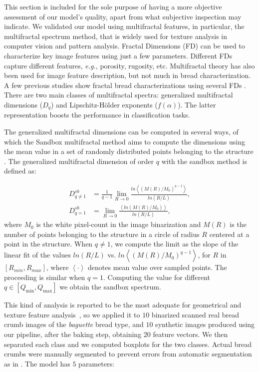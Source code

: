 This section is included for the sole purpose of having a more objective assessment of our model's quality, apart from what subjective inspection may indicate. 
We validated our model using multifractal features, in particular, the multifractal spectrum method, that is widely used for texture analysis in computer vision and pattern analysis.
Fractal Dimensions (FD) can be used to characterize key image features using just a few parameters. 
Different FDs capture different features, {\em e.g.}, porosity, rugosity, etc.
Multifractal theory has also been used for image feature description, but not much in bread characterization. 
A few previous studies show fractal bread characterizations using several FDs \cite{Gonzales2008,Baravalle2012}. 
There are two main classes of multifractal spectra: generalized multifractal dimensions ($D_{q}$) and Lipschitz-H\"older exponents ($f(\alpha)$). 
The latter representation boosts the performance in classification tasks.

The generalized multifractal dimensions can be computed in several ways, of which the Sandbox multifractal method \cite{Tel1989} aims to compute the dimensions using the mean value in a set of randomly distributed points belonging to the structure \cite{Debartolo2004}. 
The generalized multifractal dimension of order $q$ with the sandbox method is defined as:

 \begin{align*}
D_{q\ne 1}^{sb} &= \frac{1}{q-1} \lim_{R \rightarrow 0}{
\frac{ln   { \left\langle  (M(R)/M_{0})^{q-1} \right\rangle   }}
{ln {(R/L)}       }},\\
D_{q=1}^{sb} &= \lim_{R \rightarrow 0}{
\frac{ \left\langle ln   { (M(R)/M_{0})  }  \right\rangle}
{ln {(R/L)}       }},
\end{align*}
%
where $M_{0}$ is the white pixel-count in the image binarization and  $M(R)$ is the number of points belonging to the structure in a circle of radius $R$ centered at a point in the structure. 
When $q\ne1$, we compute the limit as the slope of the linear fit of the values $ln(R/L)$ vs. $ ln  \left\langle  { (M(R)/M_{0})^{q-1} }  \right\rangle$, for $R$ in $[R_{min}, R_{max}]$, where $ \left\langle \cdot  \right\rangle$ denotes mean value over sampled points. 
The proceeding is similar when $q=1$. 
Computing the value for different $q \in [Q_{\min},Q_{\max}]$  we obtain the sandbox spectrum. %

This kind of analysis is reported to be the most adequate for geometrical and texture feature analysis~\cite{Gonzales2008,Baravalle2012}, so we applied it to $10$ binarized scanned real bread crumb images of the {\em baguette} bread type, and $10$ synthetic images produced using our pipeline, after the baking step, obtaining $20$ feature vectors.
We then separated each class and we computed boxplots for the two classes.
Actual bread crumbs were manually segmented to prevent errors from automatic segmentation as in \cite{Bosch2011}.
The model has $5$ parameters:

